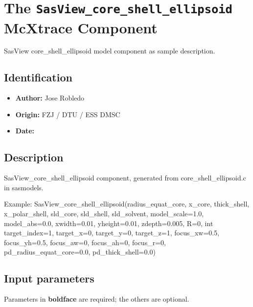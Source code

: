 \section{The \texttt{SasView\_core\_shell\_ellipsoid} McXtrace Component}
SasView core\_shell\_ellipsoid model component as sample description.

\subsection*{Identification}
\begin{itemize}
  \item \textbf{Author:} Jose Robledo
  \item \textbf{Origin:} FZJ / DTU / ESS DMSC
  \item \textbf{Date:} 
\end{itemize}

\subsection*{Description}
SasView\_core\_shell\_ellipsoid component, generated from core\_shell\_ellipsoid.c in sasmodels.

Example: SasView\_core\_shell\_ellipsoid(radius\_equat\_core, x\_core, thick\_shell, x\_polar\_shell, sld\_core, sld\_shell, sld\_solvent, model\_scale=1.0, model\_abs=0.0, xwidth=0.01, yheight=0.01, zdepth=0.005, R=0, int target\_index=1, target\_x=0, target\_y=0, target\_z=1, focus\_xw=0.5, focus\_yh=0.5, focus\_aw=0, focus\_ah=0, focus\_r=0, pd\_radius\_equat\_core=0.0, pd\_thick\_shell=0.0)

\subsection*{Input parameters}
Parameters in \textbf{boldface} are required; the others are optional.

